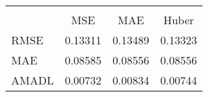 \begin{tabular}{lccc}
\hline\hline \\ [-1.8ex]
 & MSE & MAE & Huber \\ 
 \hline 
RMSE & 0.13311 & 0.13489 & 0.13323 \\ 
MAE & 0.08585 & 0.08556 & 0.08556 \\ 
AMADL & 0.00732 & 0.00834 & 0.00744 \\ 
\hline\hline
\end{tabular}
